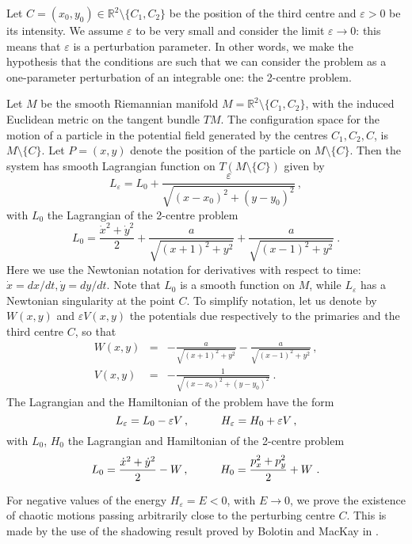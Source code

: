 \documentclass[a4paper]{article}
\begin{document}
Let $C=(x_0,y_0)\in {\mathbb{R}}^2\setminus\{C_1,C_2\}$ be the position of the third 
centre and $\varepsilon >0$ be its intensity. We assume $\varepsilon$ to be 
very small and consider the limit $\varepsilon \rightarrow 0$: this means that 
$\varepsilon$ is a perturbation parameter.  In other words, we  make the 
hypothesis that the conditions are such that we can consider the problem as a 
one-parameter perturbation of an integrable one: the 2-centre problem. 

Let $M$ be the smooth Riemannian manifold
$M={\mathbb{R}}^2\setminus\{C_1,C_2\}$, with the induced Euclidean metric on the
tangent bundle $TM$. The configuration space for the motion of a
particle in the potential field generated by the centres $C_1,C_2,C$,
is $M \setminus \{C\}$.  Let $P=(x,y)$ denote the position of the
particle on $M\setminus\{C\}$.  Then the system has smooth Lagrangian
function on $T(M\setminus\{C\})$ given by
\[
L_{\varepsilon}=L_0+\frac{\varepsilon}{\sqrt{(x-x_0)^2+(y-y_0)^2}}\,,
\]
with $L_0$ the Lagrangian of the 2-centre problem
\[
L_0=\frac{\dot{x}^2+\dot{y}^2}{2}
+\frac{a}{\sqrt{(x+1)^2+y^2}}+\frac{a}{\sqrt{(x-1)^2+y^2}}\ .
\]
Here we use the Newtonian notation for derivatives with respect to time: 
$\dot{x}=dx/dt, \dot{y}=dy/dt$. Note that $L_0$ is a smooth function on $M$, 
while $L_{\varepsilon}$ has a Newtonian singularity at the point $C$. 
To simplify notation, let us denote by $W(x,y)$ and $\varepsilon V(x,y)$ the 
potentials due respectively to the primaries and the third centre $C$, so that
\begin{eqnarray*}
  W(x,y)&=&-\frac{a}{\sqrt{(x+1)^2+y^2}}-
  \frac{a}{\sqrt{(x-1)^2+y^2}}\,,
  \\
  V(x,y)&=&-\frac{1}{\sqrt{(x-x_0)^2+(y-y_0)^2}}\ .
\end{eqnarray*}
The Lagrangian and the Hamiltonian of the problem have the form
\[
L_{\varepsilon}=L_0-\varepsilon V\,,
\hskip 1cm 
H_{\varepsilon}=H_0+\varepsilon V\,, 
\]
with $L_0$, $H_0$ the Lagrangian and Hamiltonian of the 2-centre problem
\[
L_0=\frac{\dot{x}^2+\dot{y}^2}{2} - W\,,
\hskip 1cm
H_0=\frac{p_x^2+p_y^2}{2}+W\ .
\]

For negative values of the energy $H_{\varepsilon}=E<0$, with $E
\rightarrow 0$, we prove the existence of chaotic motions passing
arbitrarily close to the perturbing centre $C$.  This is made by the
use of the shadowing result proved by Bolotin and MacKay in
\cite{BM1}.
\end{document}
